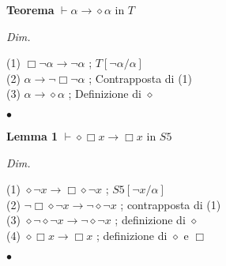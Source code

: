 \documentclass[a4paper, 12pt]{article}
\begin{document}
\begin{flushleft}
\textbf{Teorema}
$\vdash \alpha \rightarrow \diamond \alpha$ in $T$

\textit{Dim.}

(1) $\Box \neg \alpha \rightarrow \neg \alpha$ ; $T[\neg \alpha/\alpha]$ \\
(2) $\alpha \rightarrow \neg \Box \neg \alpha$ ; Contrapposta di (1) \\
(3) $\alpha \rightarrow \diamond \alpha$ ; Definizione di $\diamond$

\begin{flushright}
$\bullet$
\end{flushright}
\end{flushleft}

\begin{flushleft}
\textbf{Lemma 1}
$\vdash \diamond \Box x \rightarrow \Box x$ in $S5$

\textit{Dim.}

(1) $\diamond \neg x \rightarrow \Box \diamond \neg x$ ; $S5[\neg x/\alpha]$ \\
(2) $\neg \Box \diamond \neg x \rightarrow \neg \diamond \neg x$ ; contrapposta di (1) \\
(3) $\diamond \neg \diamond \neg x \rightarrow \neg \diamond \neg x$ ; definizione di $\diamond$ \\
(4) $\diamond \Box x \rightarrow \Box x$ ; definizione di $\diamond$ e $\Box$

\begin{flushright}
$\bullet$
\end{flushright}
\end{flushleft}
\end{document}
